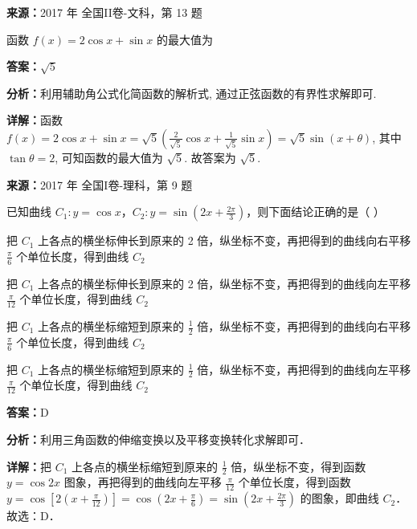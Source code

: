 \begin{question}[points=5]
\textbf{来源：}2017 年 全国II卷-文科，第 13 题\par
函数 $f(x)=2\cos x+\sin x$ 的最大值为
\fillin[{$\sqrt{5}$}]
\begin{solution}
\textbf{答案：}$\sqrt{5}$

\textbf{分析：}利用辅助角公式化简函数的解析式, 通过正弦函数的有界性求解即可.

\textbf{详解：}函数 $f(x)=2\cos x+\sin x=\sqrt{5}\left(\frac{2}{\sqrt{5}}\cos x+\frac{1}{\sqrt{5}}\sin x\right)=\sqrt{5}\sin(x+\theta)$, 其中 $\tan\theta=2$, 可知函数的最大值为 $\sqrt{5}$. 故答案为 $\sqrt{5}$.
\end{solution}
\end{question}

\begin{question}[points=5]
\textbf{来源：}2017 年 全国I卷-理科，第 9 题\par
已知曲线 $C_1:y=\cos x$，$C_2:y=\sin\left(2x+\frac{2\pi}{3}\right)$，则下面结论正确的是（ ）
\begin{choices}
  \item 把 $C_1$ 上各点的横坐标伸长到原来的 2 倍，纵坐标不变，再把得到的曲线向右平移 $\frac{\pi}{6}$ 个单位长度，得到曲线 $C_2$
  \item 把 $C_1$ 上各点的横坐标伸长到原来的 2 倍，纵坐标不变，再把得到的曲线向左平移 $\frac{\pi}{12}$ 个单位长度，得到曲线 $C_2$
  \item 把 $C_1$ 上各点的横坐标缩短到原来的 $\frac{1}{2}$ 倍，纵坐标不变，再把得到的曲线向右平移 $\frac{\pi}{6}$ 个单位长度，得到曲线 $C_2$
  \item 把 $C_1$ 上各点的横坐标缩短到原来的 $\frac{1}{2}$ 倍，纵坐标不变，再把得到的曲线向左平移 $\frac{\pi}{12}$ 个单位长度，得到曲线 $C_2$
\end{choices}
\begin{solution}
\textbf{答案：}D

\textbf{分析：}利用三角函数的伸缩变换以及平移变换转化求解即可．

\textbf{详解：}把 $C_1$ 上各点的横坐标缩短到原来的 $\frac{1}{2}$ 倍，纵坐标不变，得到函数 $y=\cos 2x$ 图象，再把得到的曲线向左平移 $\frac{\pi}{12}$ 个单位长度，得到函数 $y=\cos\left[2\left(x+\frac{\pi}{12}\right)\right]=\cos\left(2x+\frac{\pi}{6}\right)=\sin\left(2x+\frac{2\pi}{3}\right)$ 的图象，即曲线 $C_2$．故选：D．
\end{solution}
\end{question}

